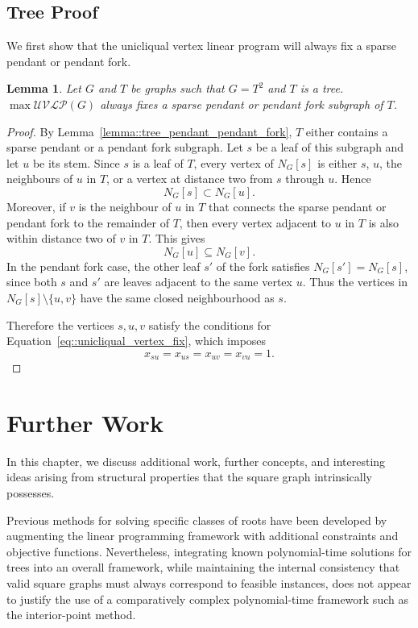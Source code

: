 \documentclass[11pt]{report}
\newtheorem{lemma}{Lemma}
\begin{document}
\section{Tree Proof}

We first show that the unicliqual vertex linear program will always fix a sparse pendant or pendant fork. 

\begin{lemma} \label{lemma::unicliqual_vertex_fix}
  Let $G$ and $T$ be graphs such that $G = T^2$ and $T$ is a tree. $\max\mathcal{UVLP}(G)$ always fixes a sparse pendant or pendant fork subgraph of $T$.
\end{lemma}
\begin{proof}
  By Lemma~\ref{lemma::tree_pendant_pendant_fork}, $T$ either contains a sparse pendant or a pendant fork subgraph. Let $s$ be a leaf of this subgraph and let $u$ be its stem. Since $s$ is a leaf of $T$, every vertex of  $N_G[s]$ is either $s$, $u$, the neighbours of $u$ in $T$, or a vertex at distance two from $s$ through $u$. Hence
  \[
  N_G[s] \subset N_G[u].
  \]
  Moreover, if $v$ is the neighbour of $u$ in $T$ that connects the sparse pendant or pendant fork to the remainder of $T$, then every vertex adjacent to $u$ in $T$ is also within distance two of $v$ in $T$.
  This gives 
  \[
  N_G[u] \subseteq N_G[v].
  \]
  In the pendant fork case, the other leaf $s'$ of the fork satisfies $N_G[s']=N_G[s]$, since both $s$ and $s'$ are leaves adjacent to the same vertex $u$. Thus the vertices in $N_G[s]\setminus\{u,v\}$ have the same closed neighbourhood as $s$.

  Therefore the vertices $s,u,v$ satisfy the conditions for  Equation~\eqref{eq::unicliqual_vertex_fix}, which imposes
  \[
  x_{su}=x_{us}=x_{uv}=x_{vu}=1.
  \]
\end{proof}



\chapter{Further Work} \label{chap::further_work}

In this chapter, we discuss additional work, further concepts, and interesting ideas arising from structural properties that the square graph intrinsically possesses. 

Previous methods for solving specific classes of roots have been developed by augmenting the linear programming framework with additional constraints and objective functions. Nevertheless, integrating known polynomial-time solutions for trees into an overall framework, while maintaining the internal consistency that valid square graphs must always correspond to feasible instances, does not appear to justify the use of a comparatively complex polynomial-time framework such as the interior-point method. 
\end{document}

